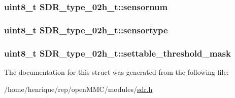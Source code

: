 \hypertarget{structSDR__type__02h__t_a1279df7a14fa05e5edb35d20fd15f5f2}{
\subsubsection[{sensornum}]{\setlength{\rightskip}{0pt plus 5cm}uint8\-\_\-t S\-D\-R\-\_\-type\-\_\-02h\-\_\-t\-::sensornum}}\label{structSDR__type__02h__t_a1279df7a14fa05e5edb35d20fd15f5f2}
\hypertarget{structSDR__type__02h__t_a57e34a84f7ea6f1c9aae57eb94945433}{
\subsubsection[{sensortype}]{\setlength{\rightskip}{0pt plus 5cm}uint8\-\_\-t S\-D\-R\-\_\-type\-\_\-02h\-\_\-t\-::sensortype}}\label{structSDR__type__02h__t_a57e34a84f7ea6f1c9aae57eb94945433}
\hypertarget{structSDR__type__02h__t_af6525580f5a554ff42c4ae6e5f79e9b1}{
\subsubsection[{settable\-\_\-threshold\-\_\-mask}]{\setlength{\rightskip}{0pt plus 5cm}uint8\-\_\-t S\-D\-R\-\_\-type\-\_\-02h\-\_\-t\-::settable\-\_\-threshold\-\_\-mask}}\label{structSDR__type__02h__t_af6525580f5a554ff42c4ae6e5f79e9b1}


The documentation for this struct was generated from the following file\-:\begin{DoxyCompactItemize}
\item 
/home/henrique/rep/open\-M\-M\-C/modules/\hyperlink{sdr_8h}{sdr.\-h}\end{DoxyCompactItemize}
